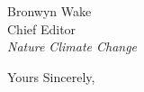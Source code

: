 \documentclass{letter}
\begin{document}
\begin{letter}{Bronwyn Wake \\ Chief Editor \\ \textit{Nature Climate Change}}
\closing{Yours Sincerely,}





\end{letter}
\end{document}
